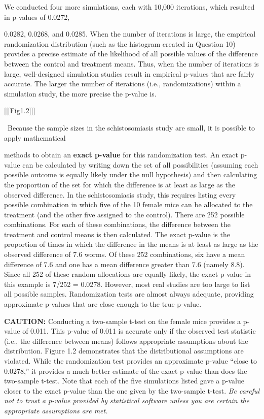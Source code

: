 \documentclass[
]{report}
\theoremstyle{definition}
\theoremstyle{definition}
\theoremstyle{definition}
\theoremstyle{definition}
\theoremstyle{remark}
\begin{document}
We conducted four more simulations, each with 10,000 iterations, which resulted in p-values of 0.0272,

0.0282, 0.0268, and 0.0285. When the number of iterations is large, the empirical randomization distribution
(such as the histogram created in Question 10) provides a precise estimate of the likelihood of all possible values of the difference between the control and treatment means. Thus, when the number of iterations is large,
well-designed simulation studies result in empirical p-values that are fairly accurate. The larger the number
of iterations (i.e., randomizations) within a simulation study, the more precise the p-value is.

{[}{[}{[}Fig1.2{]}{]}{]}

~Because the sample sizes in the schistosomiasis study are small, it is possible to apply mathematical

methods to obtain an \textbf{exact p-value} for this randomization test. An exact p-value can be calculated by writing
down the set of all possibilities (assuming each possible outcome is equally likely under the null hypothesis)
and then calculating the proportion of the set for which the difference is at least as large as the observed difference.
In the schistosomiasis study, this requires listing every possible combination in which five of the 10
female mice can be allocated to the treatment (and the other five assigned to the control). There are 252 possible
combinations. For each of these combinations, the difference between the treatment and control means
is then calculated. The exact p-value is the proportion of times in which the difference in the means is at least
as large as the observed difference of 7.6 worms. Of these 252 combinations, six have a mean difference of
7.6 and one has a mean difference greater than 7.6 (namely 8.8). Since all 252 of these random allocations are
equally likely, the exact p-value in this example is 7/252 = 0.0278. However, most real studies are too large
to list all possible samples. Randomization tests are almost always adequate, providing approximate p-values
that are close enough to the true p-value.

\large

\textbf{CAUTION:}
Conducting a two-sample t-test on the female mice provides a p-value of 0.011. This p-value of 0.011 is
accurate only if the observed test statistic (i.e., the difference between means) follows appropriate assumptions
about the distribution. Figure 1.2 demonstrates that the distributional assumptions are violated. While
the randomization test provides an approximate p-value ``close to 0.0278,'' it provides a much better estimate
of the exact p-value than does the two-sample t-test. Note that each of the five simulations listed gave a
p-value closer to the exact p-value than the one given by the two-sample t-test. \textit{Be careful not to trust a
p-value provided by statistical software unless you are certain the appropriate assumptions are met.}
\end{document}
